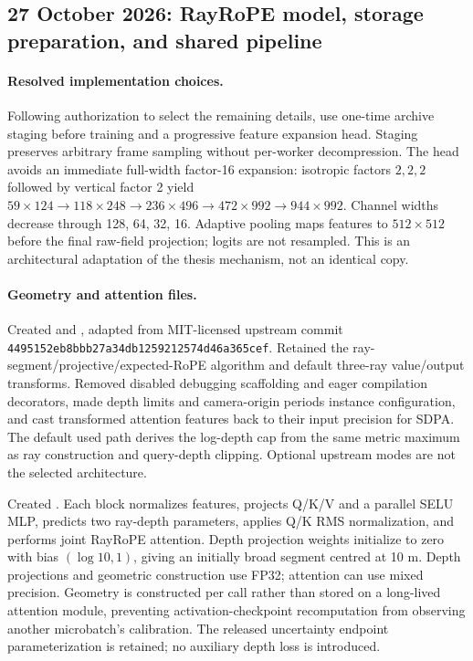 \documentclass[11pt,a4paper]{article}
\begin{document}
\subsection{27 October 2026: RayRoPE model, storage preparation, and shared pipeline}
\paragraph{Resolved implementation choices.}
Following authorization to select the remaining details, use one-time archive staging before training and a progressive feature expansion head. Staging preserves arbitrary frame sampling without per-worker decompression. The head avoids an immediate full-width factor-16 expansion: isotropic factors $2,2,2$ followed by vertical factor 2 yield $59\times124\rightarrow118\times248\rightarrow236\times496\rightarrow472\times992\rightarrow944\times992$. Channel widths decrease through 128, 64, 32, 16. Adaptive pooling maps features to $512\times512$ before the final raw-field projection; logits are not resampled. This is an architectural adaptation of the thesis mechanism, not an identical copy.

\paragraph{Geometry and attention files.}
Created  and , adapted from MIT-licensed upstream commit \texttt{4495152eb8bbb27a34db1259212574d46a365cef}. Retained the ray-segment/projective/expected-RoPE algorithm and default three-ray value/output transforms. Removed disabled debugging scaffolding and eager compilation decorators, made depth limits and camera-origin periods instance configuration, and cast transformed attention features back to their input precision for SDPA. The default used path derives the log-depth cap from the same metric maximum as ray construction and query-depth clipping. Optional upstream modes are not the selected architecture.

Created . Each block normalizes features, projects Q/K/V and a parallel SELU MLP, predicts two ray-depth parameters, applies Q/K RMS normalization, and performs joint RayRoPE attention. Depth projection weights initialize to zero with bias $(\log 10,1)$, giving an initially broad segment centred at 10 m. Depth projections and geometric construction use FP32; attention can use mixed precision. Geometry is constructed per call rather than stored on a long-lived attention module, preventing activation-checkpoint recomputation from observing another microbatch's calibration. The released uncertainty endpoint parameterization is retained; no auxiliary depth loss is introduced.
\end{document}
